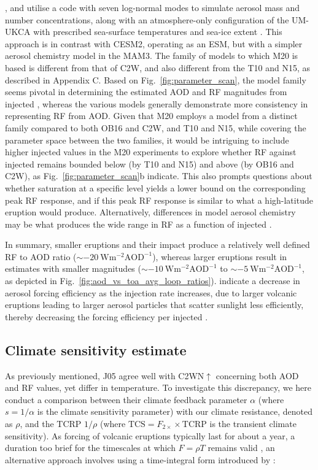 \documentclass[draft]{agujournal2019}
\newcommand{\iso}[1][i]{{#1}njected \ce{SO2}}
\newcommand{\cws}{C2WN\(\uparrow\)}
\begin{document}
,  and  utilise a code with seven log-normal
modes to simulate aerosol mass and number concentrations, along with an atmosphere-only
configuration of the UM-UKCA with prescribed sea-surface temperatures and sea-ice extent
\cite{marshall2019}. This approach is in contrast with CESM2, operating as an
ESM, but with a simpler aerosol chemistry model in the MAM3. The family of
models to which M20 is based is different from that of C2W, and also
different from the T10 and N15, as described in Appendix C. Based on
Fig.~\ref{fig:parameter_scan}, the model family seems pivotal in determining the
estimated AOD and RF magnitudes from \iso{}, whereas the various models
generally demonstrate more consistency in representing RF from AOD. Given
that M20 employs a model from a distinct family compared to both OB16 and
C2W, and T10 and N15, while covering the parameter space between the
two families, it would be intriguing to include higher \iso{} values in the M20
experiments to explore whether RF against \iso{} remains bounded below (by
T10 and N15) and above (by OB16 and C2W), as
Fig.~\ref{fig:parameter_scan}b indicate. This also prompts questions about whether
 saturation at a specific level yields a lower bound on the corresponding peak
RF response, and if this peak RF response is similar to what a high-latitude
eruption would produce. Alternatively, differences in model aerosol chemistry may be
what produces the wide range in RF as a function of \iso{}.

In summary, smaller eruptions and their impact produce a relatively well defined
RF to AOD ratio (\(\sim \SI{-20}{\watt\metre^{-2}\mathrm{AOD}^{-1}}\)),
whereas larger eruptions result in estimates with smaller magnitudes (\(\sim
\SI{-10}{\watt\metre^{-2}\mathrm{AOD}^{-1}}\) to \(\sim
\SI{-5}{\watt\metre^{-2}\mathrm{AOD}^{-1}}\), as depicted in
Fig.~\ref{fig:aod_vs_toa_avg_loop_ratios}).  indicate a decrease in
aerosol forcing efficiency as the injection rate increases, due to larger volcanic
eruptions leading to larger aerosol particles that scatter sunlight less efficiently,
thereby decreasing the forcing efficiency per \iso{} \cite{english2013, timmreck2018}.

\subsection{Climate sensitivity estimate}

As previously mentioned, J05 agree well with \cws{} concerning both AOD
and RF values, yet differ in temperature. To investigate this discrepancy, we here
conduct a comparison between their climate feedback parameter \(\alpha \) (where
\(s=1/\alpha \) is the climate sensitivity parameter) with our climate resistance,
denoted as \(\rho \), and the TCRP \(1/\rho\) (where
\(\mathrm{TCS}=F_{2\times}\times \mathrm{TCRP}\) is the transient climate sensitivity).
As forcing of volcanic eruptions typically last for about a year, a duration too brief
for the timescales at which \(F=\rho T\) remains valid \cite{gregory2016}, an
alternative approach involves using a time-integral form introduced by
:
\end{document}
